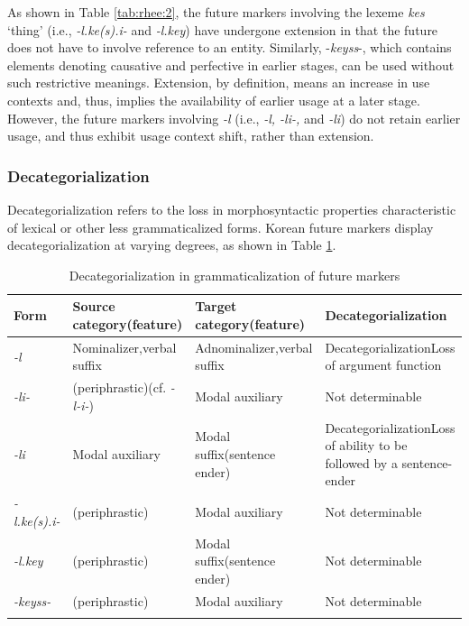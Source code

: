 \documentclass[output=paper,colorlinks,citecolor=brown]{langscibook}
\begin{document}
As shown in Table \ref{tab:rhee:2}, the future markers involving the lexeme \textit{kes} ‘thing’ (i.e., \textit{-l.ke(s).i-} and \textit{-l.key}) have undergone extension in that the future does not have to involve reference to an entity. Similarly, -\textit{keyss}-, which contains elements denoting causative and perfective in earlier stages, can be used without such restrictive meanings. Extension, by definition, means an increase in use contexts and, thus, implies the availability of earlier usage at a later stage. However, the future markers involving \textit{-l} (i.e., \textit{-l, -li-,} and \textit{-li}) do not retain earlier usage, and thus exhibit usage context shift, rather than extension.

\subsubsection{Decategorialization}
Decategorialization refers to the loss in morphosyntactic properties characteristic of lexical or other less grammaticalized forms. Korean future markers display decategorialization at varying degrees, as shown in Table \ref{tab:rhee:3}.






\begin{table}
\caption{Decategorialization in grammaticalization of future markers}
\label{tab:rhee:3}
\footnotesize
     \begin{tabularx}{.9\textwidth}{p{1.3cm} p{2.2cm}p{2.2cm}X}
  \lsptoprule
       {Form} & {Source category\newline (feature)} & {Target category\newline (feature)} & {Decategorialization} \\
\midrule
{\textit{-l}} & Nominalizer,\newline verbal suffix & Adnominalizer,\newline verbal suffix & Decategorialization\newline Loss of argument function \\\midrule
{\textit{-li-}} & (periphrastic)\newline (cf. \textit{-l-i-}) & Modal auxiliary & Not determinable \\\midrule
{\textit{-li}} & Modal auxiliary & Modal suffix\newline (sentence ender) & Decategorialization\newline Loss of ability to be followed by a sentence-ender \\\midrule
{\textit{-l.ke(s).i-}} & (periphrastic) & Modal auxiliary & Not determinable \\\midrule
{\textit{-l.key}} & (periphrastic) & Modal suffix\newline (sentence ender) & Not determinable \\\midrule
{\textit{-keyss-}} & (periphrastic) & Modal auxiliary & Not determinable \\
  \lspbottomrule
 \end{tabularx}
\end{table}
\end{document}
